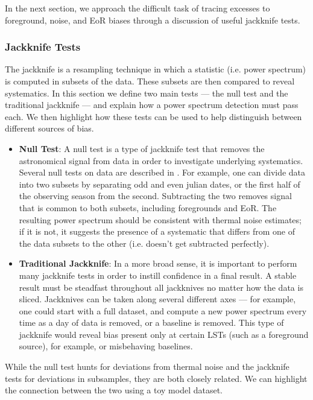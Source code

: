 \documentclass[preprint2,numberedappendix,tighten]{aastex6}  %
\begin{document}
In the next section, we approach the difficult task of tracing excesses to foreground, noise, and EoR biases through a discussion of useful jackknife tests.

\subsubsection{Jackknife Tests}
\label{sec:JackknifeOverview}

The jackknife is a resampling technique in which a statistic (i.e. power spectrum) is computed in subsets of the data. These subsets are then compared to reveal systematics. In this section we define two main tests --- the null test and the traditional jackknife --- and explain how a power spectrum detection must pass each. We then highlight how these tests can be used to help distinguish between different sources of bias.
 
\begin{itemize}
\item \textbf{Null Test}: A null test is a type of jackknife test that removes the astronomical signal from data in order to investigate underlying systematics. Several null tests on data are described in \citet{keating_et_al2016}. For example, one can divide data into two subsets by separating odd and even julian dates, or the first half of the observing season from the second. Subtracting the two removes signal that is common to both subsets, including foregrounds and EoR. The resulting power spectrum should be consistent with thermal noise estimates; if it is not, it suggests the presence of a systematic that differs from one of the data subsets to the other (i.e. doesn't get subtracted perfectly). 
\item \textbf{Traditional Jackknife}: In a more broad sense, it is important to perform many jackknife tests in order to instill confidence in a final result. A stable result must be steadfast throughout all jackknives no matter how the data is sliced. Jackknives can be taken along several different axes --- for example, one could start with a full dataset, and compute a new power spectrum every time as a day of data is removed, or a baseline is removed. This type of jackknife would reveal bias present only at certain LSTs (such as a foreground source), for example, or misbehaving baselines.
\end{itemize}

While the null test hunts for deviations from thermal noise and the jackknife tests for deviations in subsamples, they are both closely related. We can highlight the connection between the two using a toy model dataset.
\end{document}
